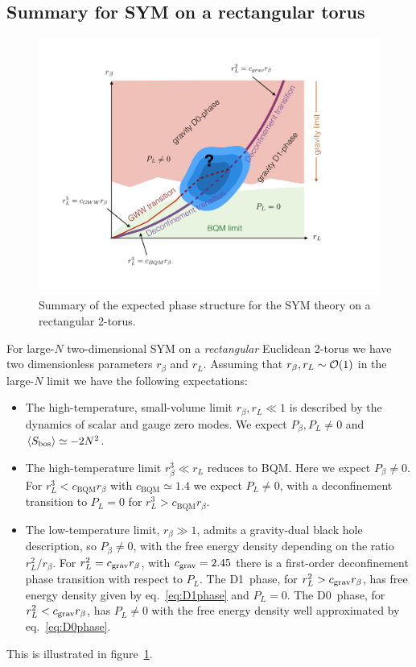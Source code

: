 \subsection{Summary for SYM on a rectangular torus}
\begin{figure}[tbp]
  \centering
  \includegraphics[width=\linewidth]{Figures/sum.pdf}
  \caption{\label{fig:summaryrect}Summary of the expected phase structure for the SYM theory on a rectangular 2-torus.}
\end{figure}

For large-$N$ two-dimensional SYM on a \emph{rectangular} Euclidean 2-torus we have two dimensionless parameters $r_{\beta}$ and $r_L$.
Assuming that $r_{\beta}, r_L \sim \mathcal O(1)$ in the large-$N$ limit we have the following expectations:
\begin{itemize}
  \item The high-temperature, small-volume limit $r_{\beta}, r_L \ll 1$ is described by the dynamics of scalar and gauge zero modes.
        We expect $P_{\beta}, P_L \ne 0$ and $\left\langle S_{\text{bos}} \right\rangle \simeq -2N^2$.
  \item The high-temperature limit $r_{\beta}^3 \ll r_L$ reduces to BQM.
        Here we expect $P_{\beta} \ne 0$.
        For $r_L^3 < c_{\text{BQM}} r_{\beta}$ with $c_{\text{BQM}} \simeq 1.4$ we expect $P_L \ne 0$, with a deconfinement transition to $P_L = 0$ for $r_L^3 > c_{\text{BQM}} r_{\beta}$.
  \item The low-temperature limit, $r_{\beta} \gg 1$, admits a gravity-dual black hole description, so $P_{\beta} \ne 0$, with the free energy density depending on the ratio $r_L^2 / r_{\beta}$.
        For $r_L^2 = c_{\text{grav}} r_{\beta}$, with $c_{\text{grav}} = 2.45$ there is a first-order deconfinement phase transition with respect to $P_L$.
        The D1~phase, for $r_L^2 > c_{\text{grav}} r_{\beta}$, has free energy density given by eq.~\eqref{eq:D1phase} and $P_L = 0$.
        The D0~phase, for $r_L^2 < c_{\text{grav}} r_{\beta}$, has $P_L \ne 0$ with the free energy density well approximated by eq.~\eqref{eq:D0phase}.
\end{itemize}
This is illustrated in figure~\ref{fig:summaryrect}.

